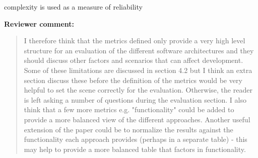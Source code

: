 \documentclass[a4]{article}
\newenvironment{review}%
{\textbf{Reviewer comment:}\begin{quote}}%
{\end{quote}}%
\newcommand{\todo}[1]{\color{red}#1\color{black}}
\begin{document}
\todo{complexity is used as a measure of reliability}

\begin{review}
I therefore think that the metrics defined only provide a very high level structure for an evaluation of the different software architectures and they should discuss other factors and scenarios that can affect development. Some of these limitations are discussed in section 4.2 but I think an extra section discuss these before the definition of the metrics would be very helpful to set the scene correctly for the evaluation. Otherwise, the reader is left asking a number of questions during the evaluation section. I also think that a few more metrics e.g. "functionality" could be added to provide a more balanced view of the different approaches. Another useful extension of the paper could be to normalize the results against the functionality each approach provides (perhaps in a separate table) - this may help to provide a more balanced table that factors in functionality.
\end{review}
\end{document}
